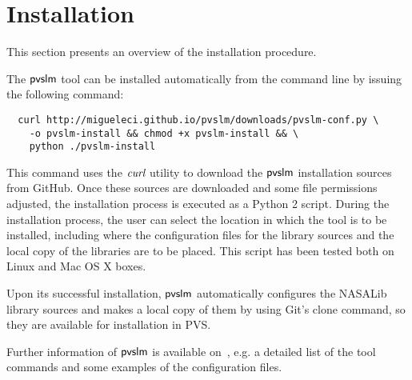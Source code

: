 \section{Installation}
\label{sec.install}

This section presents an overview of the installation procedure.

The $\textsf{pvslm}$ tool can be installed automatically from the command line
by issuing the following command:
%
\begin{verbatim}
  curl http://migueleci.github.io/pvslm/downloads/pvslm-conf.py \
    -o pvslm-install && chmod +x pvslm-install && \
    python ./pvslm-install
\end{verbatim}
%
This command uses the $\textit{curl}$ utility to download the $\textsf{pvslm}$
installation sources from GitHub. Once these sources are downloaded
and some file permissions adjusted, the installation process is
executed as a Python 2 script. During the installation process, the
user can select the location in which the tool is to be installed,
including where the configuration files for the library sources and
the local copy of the libraries are to be placed. This script has been
tested both on Linux and Mac OS X boxes. 

Upon its successful installation, $\textsf{pvslm}$ automatically configures
the NASALib library sources and makes a local copy of them by using
Git's clone command, so they are available for installation in PVS.

Further information of $\textsf{pvslm}$ is available on~\cite{pvslm}, e.g. a 
detailed list of the tool commands and some examples of the configuration
files.
